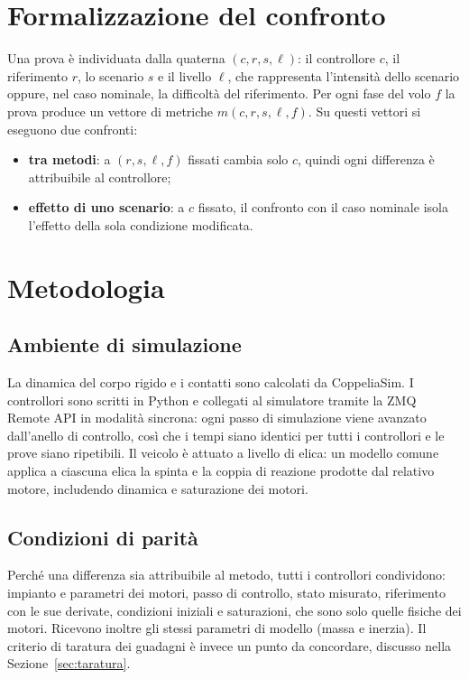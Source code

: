 \documentclass[11pt,a4paper]{article}
\begin{document}
\section{Formalizzazione del confronto}

Una prova è individuata dalla quaterna $(c, r, s, \ell)$: il controllore $c$, il riferimento $r$, lo scenario $s$ e il livello $\ell$, che rappresenta l'intensità dello scenario oppure, nel caso nominale, la difficoltà del riferimento. Per ogni fase del volo $f$ la prova produce un vettore di metriche $m(c, r, s, \ell, f)$. Su questi vettori si eseguono due confronti:
\begin{itemize}
  \item \textbf{tra metodi}: a $(r, s, \ell, f)$ fissati cambia solo $c$, quindi ogni differenza è attribuibile al controllore;
  \item \textbf{effetto di uno scenario}: a $c$ fissato, il confronto con il caso nominale isola l'effetto della sola condizione modificata.
\end{itemize}

\section{Metodologia}

\subsection{Ambiente di simulazione}

La dinamica del corpo rigido e i contatti sono calcolati da CoppeliaSim. I controllori sono scritti in Python e collegati al simulatore tramite la ZMQ Remote API in modalità sincrona: ogni passo di simulazione viene avanzato dall'anello di controllo, così che i tempi siano identici per tutti i controllori e le prove siano ripetibili. Il veicolo è attuato a livello di elica: un modello comune applica a ciascuna elica la spinta e la coppia di reazione prodotte dal relativo motore, includendo dinamica e saturazione dei motori.

\subsection{Condizioni di parità}

Perché una differenza sia attribuibile al metodo, tutti i controllori condividono: impianto e parametri dei motori, passo di controllo, stato misurato, riferimento con le sue derivate, condizioni iniziali e saturazioni, che sono solo quelle fisiche dei motori. Ricevono inoltre gli stessi parametri di modello (massa e inerzia). Il criterio di taratura dei guadagni è invece un punto da concordare, discusso nella Sezione~\ref{sec:taratura}.
\end{document}
